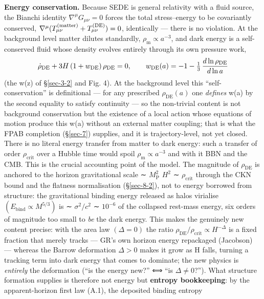 \documentclass[preprint,12pt]{elsarticle}
\begin{document}
\textbf{Energy conservation.} Because SEDE is general relativity with a
fluid source, the Bianchi identity \(\nabla^\mu G_{\mu\nu}=0\) forces
the total stress--energy to be covariantly conserved,
\(\nabla^\mu(T^{(\rm matter)}_{\mu\nu} + T^{(\rm DE)}_{\mu\nu})=0\),
identically --- there is no violation. At the background level matter
dilutes standardly, \(\rho _{\mathrm{m}} \propto  a^{-3}\), and dark
energy is a self-conserved fluid whose density evolves entirely through
its own pressure work,
\begin{equation}\dot\rho_{\rm DE} + 3H\,(1+w_{\rm DE})\,\rho_{\rm DE} = 0, \qquad
w_{\rm DE}(a) = -1 - \tfrac13\,\frac{d\ln\rho_{\rm DE}}{d\ln a}\end{equation} (the
w(z) of §\ref{sec-3-2} and Fig. 4). At the background level this
``self-conservation'' is definitional --- for any prescribed
\(\rho _\mathrm{DE}(a)\) one \emph{defines} w(a) by the second equality
to satisfy continuity --- so the non-trivial content is not background
conservation but the existence of a local action whose equations of
motion produce this w(a) without an external matter coupling; that is
what the FPAB completion (§\ref{sec-7}) supplies, and it is
trajectory-level, not yet closed. There is no literal energy transfer
from matter to dark energy: such a transfer of order
\(\rho _{\mathrm{crit}}\) over a Hubble time would spoil
\(\rho _{\mathrm{m}} \propto  a^{-3}\) and with it BBN and the CMB. This
is the crucial accounting point of the model. The magnitude of
\(\rho _\mathrm{DE}\) is anchored to the horizon gravitational scale ∼
\(M_{\mathrm{P}}^{2}\) \(H^{2}\) ∼ \(\rho _{\mathrm{crit}}\) through the
CKN bound and the flatness normalisation (§\ref{sec-8-2}), not to energy
borrowed from structure: the gravitational binding energy released as
halos virialise \((E_{\mathrm{bind}} \propto  M^{5/3})\) is ∼
\(\sigma ^{2}/c^{2}\) ∼ \(10^{-6}\) of the collapsed rest-mass energy,
six orders of magnitude too small to \emph{be} the dark energy. This
makes the genuinely new content precise: with the area law
\((\Delta =0)\) the ratio
\(\rho _\mathrm{DE}/\rho _{\mathrm{crit}} \propto  H^{-\Delta }\) is a
fixed fraction that merely tracks --- GR's own horizon energy repackaged
(Jacobson) --- whereas the Barrow deformation \(\Delta >0\) makes it
grow as H falls, turning a tracking term into dark energy that comes to
dominate; the new physics is \emph{entirely} the deformation (``is the
energy new?'' ⟺ ``is \(\Delta \neq 0\)?''). What structure formation
supplies is therefore not energy but \textbf{entropy bookkeeping}: by
the apparent-horizon first law (A.1), the deposited binding entropy
\end{document}
